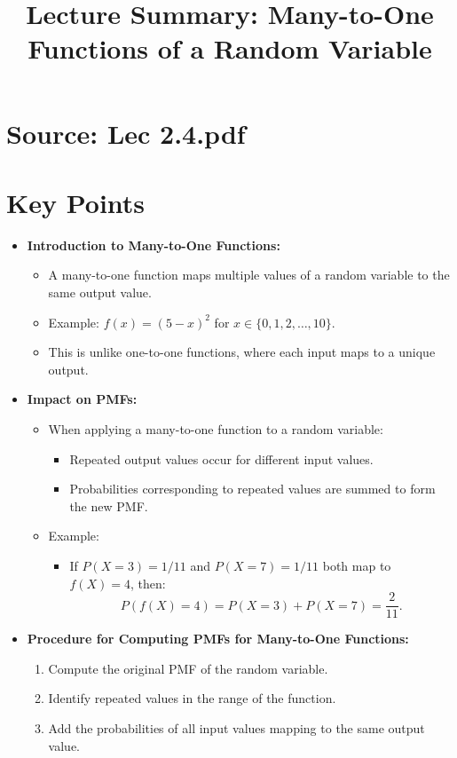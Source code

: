 \documentclass{article}
\title{Lecture Summary: Many-to-One Functions of a Random Variable}
\author{}
\date{}
\begin{document}
\maketitle

\section*{Source: Lec 2.4.pdf}

\section*{Key Points}

\begin{itemize}
  \item \textbf{Introduction to Many-to-One Functions:}
    \begin{itemize}
      \item A many-to-one function maps multiple values of a random variable to the same output value.
      \item Example: $f(x) = (5 - x)^2$ for $x \in \{0, 1, 2, \dots, 10\}$.
      \item This is unlike one-to-one functions, where each input maps to a unique output.
    \end{itemize}

  \item \textbf{Impact on PMFs:}
    \begin{itemize}
      \item When applying a many-to-one function to a random variable:
        \begin{itemize}
          \item Repeated output values occur for different input values.
          \item Probabilities corresponding to repeated values are summed to form the new PMF.
        \end{itemize}
      \item Example:
        \begin{itemize}
          \item If $P(X = 3) = 1/11$ and $P(X = 7) = 1/11$ both map to $f(X) = 4$, then:
            \[
              P(f(X) = 4) = P(X = 3) + P(X = 7) = \frac{2}{11}.
            \]
        \end{itemize}
    \end{itemize}

  \item \textbf{Procedure for Computing PMFs for Many-to-One Functions:}
    \begin{enumerate}
      \item Compute the original PMF of the random variable.
      \item Identify repeated values in the range of the function.
      \item Add the probabilities of all input values mapping to the same output value.
    \end{enumerate}


\end{itemize}
\end{document}
